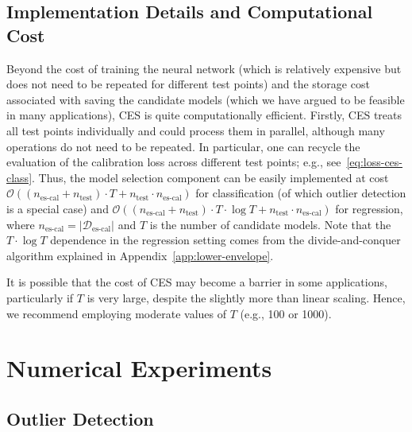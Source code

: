 \subsection{Implementation Details and Computational Cost}

Beyond the cost of training the neural network (which is relatively expensive but does not need to be repeated for different test points) and the storage cost associated with saving the candidate models (which we have argued to be feasible in many applications), CES is quite computationally efficient.
Firstly, CES treats all test points individually and could process them in parallel, although many operations do not need to be repeated. In particular, one can recycle the evaluation of the calibration loss across different test points; e.g., see~\eqref{eq:loss-ces-class}. 
Thus, the model selection component can be easily implemented at cost $\mathcal{O}((n_{\text{es-cal}} + n_{\text{test}}) \cdot T + n_{\text{test}} \cdot n_{\text{es-cal}})$ for classification (of which outlier detection is a special case) and $\mathcal{O}((n_{\text{es-cal}} + n_{\text{test}}) \cdot T \cdot \log T + n_{\text{test}} \cdot n_{\text{es-cal}})$ for regression, where $n_{\text{es-cal}} = |\mathcal{D}_{\text{es-cal}}|$ and $T$ is the number of candidate models. Note that the $T \cdot \log T$ dependence in the regression setting comes from the divide-and-conquer algorithm explained in Appendix~\ref{app:lower-envelope}.

It is possible that the cost of CES may become a barrier in some applications, particularly if $T$ is very large, despite the slightly more than linear scaling. Hence, we recommend employing moderate values of $T$ (e.g., 100 or 1000).

\section{Numerical Experiments} \label{sec:numerical_results}


\subsection{Outlier Detection} \label{sec:num_od}

